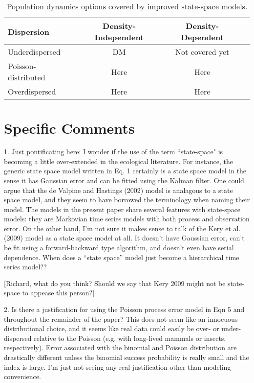 \documentclass[12pt,english]{article}
\begin{document}
\begin{spacing}{1.9}
\begin{flushleft}
\begin{table}[t]
  \centering
\caption{Population dynamics options covered by improved state-space models.}  
\begin{tabular}{lccc}
    \hline
Dispersion & Density-Independent & Density-Dependent  \\    
\hline
    Underdispersed	        &DM	&Not covered yet  \\
    Poisson-distributed	        &Here	&Here   \\
    Overdispersed		 &Here	&Here    \\
    \hline
  \end{tabular}
\end{table}


\section*{Specific Comments}

1. Just pontificating here: I wonder if the use of the term “state-space" is becoming a little over-extended 
in the ecological literature. For instance, the generic state space model written in Eq. 1 certainly is a 
state space model in the sense it has Gaussian error and can be fitted using the Kalman filter. One could 
argue that the de Valpine and Hastings (2002) model is analagous to a state space model, and they seem 
to have borrowed the terminology when naming their model. The models in the present paper share 
several features with state-space models: they are Markovian time series models with both process and 
observation error. On the other hand, I'm not sure it makes sense to talk of the Kery et al. (2009) model 
as a state space model at all. It doesn't have Gaussian error, can't be fit using a forward-backward type 
algorithm, and doesn't even have serial dependence. When does a “state space” model just become a 
hierarchical time series model??

[Richard, what do you think?  Should we say that Kery 2009 might not be state-space to appease this person?]

2. Is there a justification for using the Poisson process error model in Eqn 5 and throughout the remainder 
of the paper? This does not seem like an innocuous distributional choice, and it seems like real data could 
easily be over- or under-dispersed relative to the Poisson (e.g. with long-lived mammals or insects, respectively). 
Error associated with the binomial and Poisson distribution are drastically different unless the binomial success 
probability is really small and the index is large. I'm just not seeing any real justification other than modeling convenience.


\end{flushleft}
\end{spacing}
\end{document}
